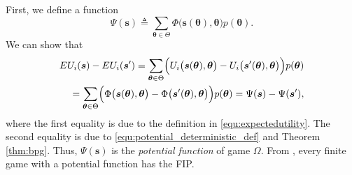 \documentclass[journal]{IEEEtran}
\newcommand{\bs}[1]{\boldsymbol{#1}}
\begin{document}
  First, we define a function 
%
\begin{equation} \label{equ:potential_random}
	\Psi(\bs{s}) \triangleq \sum_{\boldsymbol{\theta} \in \Theta} \Phi \bigl( \boldsymbol{s}(\boldsymbol{\theta}), \boldsymbol{\theta} \bigr) p(\boldsymbol{\theta}).
\end{equation}
%	
  We can show that
%
\begin{equation} %
\begin{split} 
EU_i(\bs{s}) - EU_i(\bs{s}') = \sum_{\boldsymbol{\theta} \in \Theta} \Bigl( U_i \bigl( \boldsymbol{s}(\boldsymbol{\theta}), \boldsymbol{\theta} \bigr) - U_i \bigl( \boldsymbol{s}'(\boldsymbol{\theta}), \boldsymbol{\theta} \bigr) \Bigr) p(\boldsymbol{\theta}) \\ 
= \sum_{\boldsymbol{\theta} \in \Theta} \Bigl( \Phi \bigl( \boldsymbol{s}(\boldsymbol{\theta}), \boldsymbol{\theta} \bigr) - \Phi \bigl( \boldsymbol{s}'(\boldsymbol{\theta}), \boldsymbol{\theta} \bigr) \Bigr) p(\boldsymbol{\theta}) 
= \Psi(\bs{s}) - \Psi(\bs{s}'),
\end{split} 
\end{equation}
%
%
where the first equality is due to the definition in \eqref{equ:expectedutility}.
  The second equality is due to \eqref{equ:potential_deterministic_def} and Theorem \ref{thm:bpg}.
  Thus, $\Psi(\bs{s})$ is the \emph{potential function} of game $\Omega$.
  From \cite{monderer_pg96}, every finite game with a potential function has the FIP. 	\hfill \IEEEQED %
	
\end{document}
